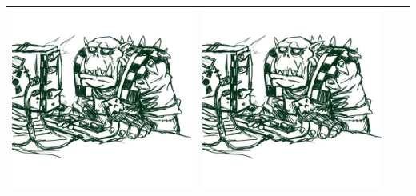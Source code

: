 \documentclass{article}
\begin{document}
\begin{center}
\begin{tabular}{|c| c |c|c|}
			\includegraphics[origin = c,scale=0.05]{wut} &
			\includegraphics[angle = 180, origin = c, scale=0.15]{wut}\\
			\hline

\end{tabular}
\end{center}
\end{document}
